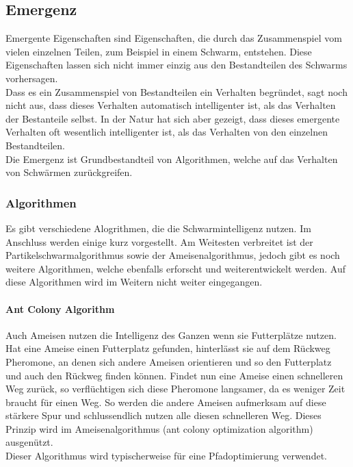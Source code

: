 		\subsection{Emergenz}
		Emergente Eigenschaften sind Eigenschaften, die durch das Zusammenspiel vom vielen einzelnen Teilen, zum Beispiel in einem Schwarm, entstehen. Diese Eigenschaften lassen sich nicht immer einzig aus den Bestandteilen des Schwarms vorhersagen. \\
		Dass es ein Zusammenspiel von Bestandteilen ein Verhalten begründet, sagt noch nicht aus, dass dieses Verhalten automatisch intelligenter ist, als das Verhalten der Bestanteile selbst. In der Natur hat sich aber gezeigt, dass dieses emergente Verhalten oft wesentlich intelligenter ist, als das Verhalten von den einzelnen Bestandteilen. \\
		Die Emergenz ist Grundbestandteil von Algorithmen, welche auf das Verhalten von Schwärmen zurückgreifen.
		
		
				
		\subsubsection{Algorithmen}
		Es gibt verschiedene Alogrithmen, die die Schwarmintelligenz nutzen. Im Anschluss werden einige kurz vorgestellt. Am Weitesten verbreitet ist der Partikelschwarmalgorithmus sowie der Ameisenalgorithmus, jedoch gibt es noch weitere Algorithmen, welche ebenfalls erforscht und weiterentwickelt werden. Auf diese Algorithmen wird im Weitern nicht weiter eingegangen.
		
		\paragraph{Ant Colony Algorithm}
		$\;$ \\
		Auch Ameisen nutzen die Intelligenz des Ganzen wenn sie Futterplätze nutzen. Hat eine Ameise einen Futterplatz gefunden, hinterlässt sie auf dem Rückweg Pheromone, an denen sich andere Ameisen orientieren und so den Futterplatz und auch den Rückweg finden können. Findet nun eine Ameise einen schnelleren Weg zurück, so verflüchtigen sich diese Pheromone langsamer, da es weniger Zeit braucht für einen Weg. So werden die andere Ameisen aufmerksam auf diese stärkere Spur und schlussendlich nutzen alle diesen schnelleren Weg. Dieses Prinzip wird im Ameisenalgorithmus (ant colony optimization algorithm) ausgenützt.\\Dieser Algorithmus wird typischerweise für eine Pfadoptimierung verwendet.
		
